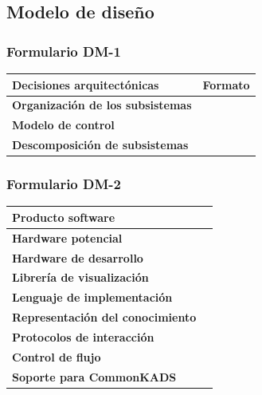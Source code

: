 \documentclass[a4paper,11pt]{article}
\begin{document}
		\subsection{Modelo de diseño}
			\subsubsection{Formulario DM-1}
			\begin{center}
				\begin{tabular}{| l | l |}
					\hline
					\textbf{Decisiones arquitectónicas} & \textbf{Formato} \\
					\hline
					\textbf{Organización de los subsistemas} & \\
					\hline
					\textbf{Modelo de control} & \\
					\hline
					\textbf{Descomposición de subsistemas} & \\
					\hline
				\end{tabular}
			\end{center}
			\subsubsection{Formulario DM-2}
			\begin{center}
				\begin{tabular}{| l | l |}
					\hline
					\textbf{Producto software} &  \\
					\hline
					\textbf{Hardware potencial} & \\
					\hline
					\textbf{Hardware de desarrollo} & \\
					\hline
					\textbf{Librería de visualización} & \\
					\hline
					\textbf{Lenguaje de implementación} &  \\
					\hline
					\textbf{Representación del conocimiento} & \\
					\hline
					\textbf{Protocolos de interacción} & \\
					\hline
					\textbf{Control de flujo} & \\
					\hline
					\textbf{Soporte para CommonKADS} & \\
					\hline
				\end{tabular}
			\end{center}
\end{document}
